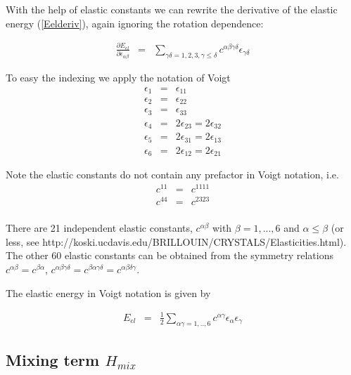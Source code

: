 With the help of elastic constants we can rewrite the derivative of the elastic energy
(\ref{Eelderiv}), again ignoring the rotation dependence:

\begin{eqnarray}\label{Eelderivelconst}
\frac{\partial E_{el}}{\partial \epsilon_{\alpha\beta}}&=&
\sum_{\gamma\delta=1,2,3,\gamma \le \delta} c^{\alpha\beta\gamma\delta} \epsilon_{\gamma\delta}
\end{eqnarray}




To easy the indexing we apply the notation of Voigt
\begin{eqnarray}\label{voigt}
\epsilon_1&=&\epsilon_{11}  \\
\epsilon_2&=&\epsilon_{22} \nonumber \\
\epsilon_3&=&\epsilon_{33}\nonumber \\
\epsilon_4&=&2\epsilon_{23}=2\epsilon_{32}\nonumber \\
\epsilon_5&=&2\epsilon_{31}=2\epsilon_{13}\nonumber \\
\epsilon_6&=&2\epsilon_{12}=2\epsilon_{21} \nonumber
\end{eqnarray}

Note the elastic constants do not contain any prefactor in Voigt notation, i.e.
\begin{eqnarray}\label{voigtel}
c^{11}&=&c^{1111} \\
c^{44}&=&c^{2323} \nonumber \\
\end{eqnarray}

There are 21 independent elastic constants, $c^{\alpha\beta}$ with $\beta=1,...,6$ and
$\alpha \le \beta$ (or less, see  http://koski.ucdavis.edu/BRILLOUIN/CRYSTALS/Elasticities.html). The other 60 elastic constants 
can be obtained from the symmetry relations $c^{\alpha\beta}=c^{\beta\alpha}$, 
$c^{\alpha\beta\gamma\delta}=c^{\beta\alpha\gamma\delta}=c^{\alpha\beta\delta\gamma}$.

The elastic energy in Voigt notation is given by

\begin{eqnarray}\label{Eelconstvoigt}
E_{el} &=& \frac{1}{2}\sum_{\alpha\gamma=1,..,6} c^{\alpha\gamma} \epsilon_{\alpha}\epsilon_{\gamma}
\end{eqnarray}

\subsection{Mixing term $H_{mix}$}

